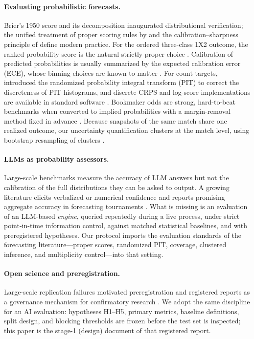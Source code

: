 \documentclass[11pt]{article}
\begin{document}
\paragraph{Evaluating probabilistic forecasts.}
Brier's 1950 score \citep{brier1950} and its decomposition
\citep{murphy1973} inaugurated distributional verification; the unified
treatment of proper scoring rules by \citet{gneiting2007} and the
calibration--sharpness principle of \citet{gneiting2007b} define modern
practice. For the ordered three-class 1X2 outcome, the ranked probability score
is the natural strictly proper choice \citep{gneiting2007}. Calibration of
predicted probabilities is usually summarized by the expected calibration
error (ECE), whose binning choices are known to matter
\citep{naeini2015,guo2017}. For count targets, \citet{czado2009} introduced the
randomized probability integral transform (PIT) to correct the discreteness of
PIT histograms, and discrete CRPS and log-score implementations are available
in standard software \citep{jordan2019}. Bookmaker odds are strong,
hard-to-beat benchmarks when converted to implied probabilities with a
margin-removal method fixed in advance \citep{spann2009}. Because snapshots of
the same match share one realized outcome, our uncertainty quantification
clusters at the match level, using bootstrap resampling of clusters
\citep{efron1979,cameron2015}.

\paragraph{LLMs as probability assessors.}
Large-scale benchmarks measure the accuracy of LLM answers
\citep{hendrycks2021} but not the calibration of the full distributions they
can be asked to output. A growing literature elicits verbalized or numerical
confidence \citep{lin2022,xiong2024} and reports promising aggregate accuracy
in forecasting tournaments \citep{halawi2024,schoenegger2024}. What is missing
is an evaluation of an LLM-based \emph{engine}, queried repeatedly during a
live process, under strict point-in-time information control, against matched
statistical baselines, and with preregistered hypotheses. Our protocol imports
the evaluation standards of the forecasting literature---proper scores,
randomized PIT, coverage, clustered inference, and multiplicity control---into
that setting.

\paragraph{Open science and preregistration.}
Large-scale replication failures \citep{osc2015} motivated preregistration and
registered reports as a governance mechanism for confirmatory research
\citep{nosek2018}. We adopt the same discipline for an AI evaluation:
hypotheses H1--H5, primary metrics, baseline definitions, split design, and
blocking thresholds are frozen before the test set is inspected; this paper is
the stage-1 (design) document of that registered report.
\end{document}
